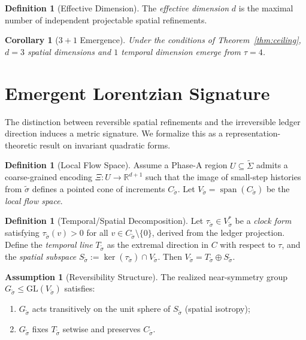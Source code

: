 \documentclass[11pt,a4paper]{article}
\newtheorem{corollary}[theorem]{Corollary}
\theoremstyle{definition}
\newtheorem{definition}[theorem]{Definition}
\newtheorem{assumption}[theorem]{Assumption}
\theoremstyle{remark}
\begin{document}
\begin{definition}[Effective Dimension]\label{def:dim}
The \emph{effective dimension} $d$ is the maximal number of independent projectable spatial refinements.
\end{definition}

\begin{corollary}[$3+1$ Emergence]\label{cor:31}
Under the conditions of Theorem~\ref{thm:ceiling}, $d = 3$ spatial dimensions and $1$ temporal dimension emerge from $\tau = 4$.
\end{corollary}

\section{Emergent Lorentzian Signature}

The distinction between reversible spatial refinements and the irreversible ledger direction induces a metric signature. We formalize this as a representation-theoretic result on invariant quadratic forms.

\begin{definition}[Local Flow Space]\label{def:flow}
Assume a Phase-A region $U \subseteq \widetilde{\Sigma}$ admits a coarse-grained encoding $\Xi \colon U \to \mathbb{R}^{d+1}$ such that the image of small-step histories from $\tilde{\sigma}$ defines a pointed cone of increments $C_{\tilde{\sigma}}$. Let $V_{\tilde{\sigma}} = \operatorname{span}(C_{\tilde{\sigma}})$ be the \emph{local flow space}.
\end{definition}

\begin{definition}[Temporal/Spatial Decomposition]\label{def:decomp}
Let $\tau_{\tilde{\sigma}} \in V_{\tilde{\sigma}}^*$ be a \emph{clock form} satisfying $\tau_{\tilde{\sigma}}(v) > 0$ for all $v \in C_{\tilde{\sigma}} \setminus \{0\}$, derived from the ledger projection. Define the \emph{temporal line} $T_{\tilde{\sigma}}$ as the extremal direction in $C$ with respect to $\tau$, and the \emph{spatial subspace} $S_{\tilde{\sigma}} := \ker(\tau_{\tilde{\sigma}}) \cap V_{\tilde{\sigma}}$. Then $V_{\tilde{\sigma}} = T_{\tilde{\sigma}} \oplus S_{\tilde{\sigma}}$.
\end{definition}

\begin{assumption}[Reversibility Structure]\label{ass:reverse}
The realized near-symmetry group $G_{\tilde{\sigma}} \leq \mathrm{GL}(V_{\tilde{\sigma}})$ satisfies:
\begin{enumerate}[label=(\roman*)]
  \item $G_{\tilde{\sigma}}$ acts transitively on the unit sphere of $S_{\tilde{\sigma}}$ (spatial isotropy);
  \item $G_{\tilde{\sigma}}$ fixes $T_{\tilde{\sigma}}$ setwise and preserves $C_{\tilde{\sigma}}$.
\end{enumerate}
\end{assumption}
\end{document}
